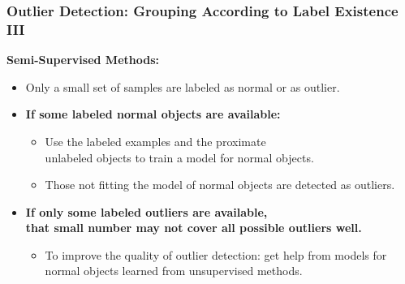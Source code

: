 \begin{frame}
	\frametitle{Outlier Detection: Grouping According to Label Existence III}
	\textcolor{faugray}{\textbf{Semi-Supervised Methods:}}
	\begin{itemize}
		\item Only a small set of samples are labeled as normal or as outlier.
		\item \textbf{If some {\color{airforceblue}labeled normal objects} are available:}
		      \begin{itemize}
			      \item Use the labeled examples and the proximate \\
			            unlabeled objects to train a model for normal objects.
			      \item Those not fitting the model of normal objects are detected as outliers.
		      \end{itemize}
		\item \textbf{If only some {\color{airforceblue}labeled outliers} are available, \\ that small number may not cover all possible outliers well.}
		      \begin{itemize}
			      \item To improve the quality of outlier detection: get help from models for normal objects learned from unsupervised methods.
		      \end{itemize}
	\end{itemize}
\end{frame}


